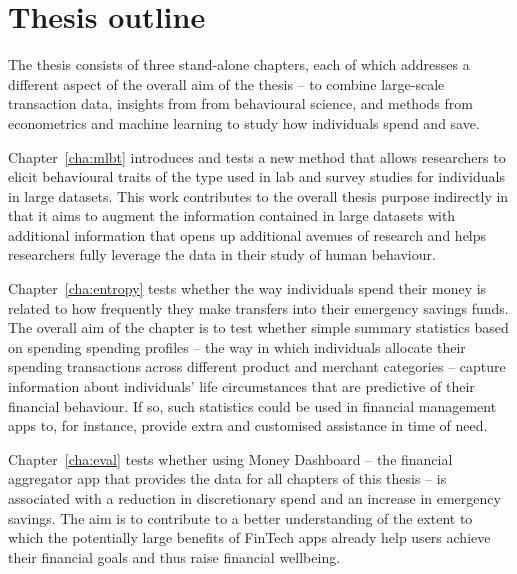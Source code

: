 
\section{Thesis outline}%
\label{sec:outline}

The thesis consists of three stand-alone chapters, each of which addresses a
different aspect of the overall aim of the thesis -- to combine large-scale
transaction data, insights from from behavioural science, and methods from
econometrics and machine learning to study how individuals spend and save. 

Chapter~\ref{cha:mlbt} introduces and tests a new method that allows
researchers to elicit behavioural traits of the type used in lab and survey
studies for individuals in large datasets. This work contributes to the overall
thesis purpose indirectly in that it aims to augment the information contained
in large datasets with additional information that opens up additional avenues
of research and helps researchers fully leverage the data in their study of
human behaviour.

Chapter~\ref{cha:entropy} tests whether the way individuals spend their money
is related to how frequently they make transfers into their emergency savings
funds. The overall aim of the chapter is to test whether simple summary
statistics based on spending spending profiles -- the way in which individuals
allocate their spending transactions across different product and merchant
categories -- capture information about individuals' life circumstances that
are predictive of their financial behaviour. If so, such statistics could be
used in financial management apps to, for instance, provide extra and
customised assistance in time of need.

Chapter~\ref{cha:eval} tests whether using Money Dashboard -- the financial
aggregator app that provides the data for all chapters of this thesis -- is
associated with a reduction in discretionary spend and an increase in emergency
savings. The aim is to contribute to a better understanding of the extent to
which the potentially large benefits of FinTech apps already help users achieve
their financial goals and thus raise financial wellbeing.
